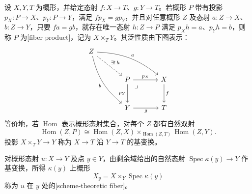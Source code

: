 \begin{definition}\label{b3:def:scheme-fiber-product}\label{b3:def:scheme-theoretic-fiber}
	设 \(X,Y,T\) 为概形，并给定态射 \(f:X\to T\)、\(g:Y\to T\)。若概形 \(P\) 带有投影 \(p_X:P\to X\)、\(p_Y:P\to Y\)，满足 \(fp_X=gp_Y\)，并且对任意概形 \(Z\) 及态射 \(a:Z\to X\)、\(b:Z\to Y\)，只要 \(fa=gb\)，就存在唯一态射 \(h:Z\to P\) 满足 \(p_Xh=a\)、\(p_Yh=b\)，则称 \(P\) 为[fiber product]，记为 \(X\times_TY\)。其泛性质由下图表示：
	\[
		\begin{tikzcd}[column sep=large,row sep=large]
			Z \arrow[drr,bend left=18,"a"] \arrow[ddr,bend right=18,"b"'] \arrow[dr,dashed,"{\exists!\,h}"] & & \\
			& P \arrow[r,"p_X"] \arrow[d,"p_Y"'] \arrow[dr,phantom,"\lrcorner",very near start] & X \arrow[d,"f"] \\
			& Y \arrow[r,"g"'] & T
		\end{tikzcd}
	\]
	等价地，若 \(\operatorname{Hom}\) 表示概形态射集合，对每个 \(Z\) 都有自然双射
	\[
		\operatorname{Hom}(Z,P) \cong\operatorname{Hom}(Z,X) \times_{\operatorname{Hom}(Z,T)}\operatorname{Hom}(Z,Y).
	\]
	投影 \(X\times_TY\rightarrow Y\) 称为 \(X\rightarrow T\) 沿 \(Y\rightarrow T\) 的基变换。

	对概形态射 \(u:X\to Y\) 及点 \(y\in Y\)，由剩余域给出的自然态射 \(\operatorname{Spec}\kappa(y)\to Y\) 作基变换，所得 \(\kappa(y)\) 上概形
	\[
		X_y=X\times_Y\operatorname{Spec}\kappa(y)
	\]
	称为 \(u\) 在 \(y\) 处的[scheme-theoretic fiber]。
\end{definition}

